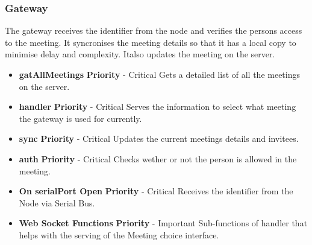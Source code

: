 \documentclass{article}
\begin{document}
		\subsubsection{Gateway} The gateway receives the identifier from the node and verifies the persons access to the meeting. It syncronises the meeting details so that it has a local copy to minimise delay and complexity. Italso updates the meeting on the server.
		\begin{itemize}
			\item \textbf{gatAllMeetings}
				\newline\textbf{ Priority } - Critical
				\newline Gets a detailed list of all the meetings on the server.
			\item \textbf{handler}
				\newline\textbf{ Priority } - Critical
				\newline Serves the information to select what meeting the gateway is used for currently.
			\item \textbf{sync}
				\newline\textbf{ Priority } - Critical
				\newline Updates the current meetings details and invitees.
			\item \textbf{auth}
				\newline\textbf{ Priority } - Critical
				\newline Checks wether or not the person is allowed in the meeting.
			\item \textbf{On serialPort Open}
				\newline\textbf{ Priority } - Critical
				\newline Receives the identifier from the Node via Serial Bus.
			\item \textbf{Web Socket Functions}
				\newline\textbf{ Priority } - Important
				\newline Sub-functions of handler that helps with the serving of the Meeting choice interface.
			

		\end{itemize}



\newpage
		
\end{document}
